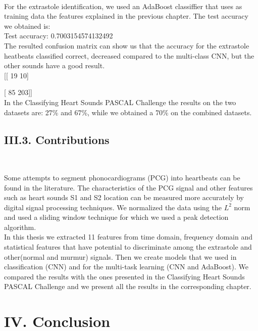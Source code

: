 \documentclass[11pt, a4papper]{report}
\theoremstyle{plain}
\theoremstyle{definition}
\theoremstyle{definition}
\theoremstyle{proposition}
\begin{document}
\

For the extrastole identification, we used an AdaBoost classiffier that uses as training data the features explained in the previous chapter. The test accuracy we obtained is:
\\

Test accuracy: 0.7003154574132492
\\

The resulted confusion matrix can show us that the accuracy for the extrastole heatbeats classified correct, decreased compared to the multi-class CNN, but the other sounds have a good result.
\\

[[ 19  10]
\

 [ 85 203]]
\\

In the Classifying Heart Sounds PASCAL Challenge the results on the two datasets are: 27\% and 67\%, while we obtained a 70\% on the combined datasets.
\newpage

\section*{III.3. Contributions}

\

Some attempts to segment phonocardiograms (PCG) into heartbeats can be found in the literature. The characteristics of the PCG signal and other features such as heart sounds S1 and S2 location can be measured more accurately by digital signal processing techniques. We normalized the data using the $L^2$ norm and used a sliding window technique for which we used a peak detection algorithm. 
\\

In this thesis we extracted 11 features from time domain, frequency domain and statistical features that have potential to discriminate among the extrastole and other(normal and murmur) signals. Then we create models that we used in classification (CNN) and for the multi-task learning (CNN and AdaBoost). We compared the results with the ones presented in the Classifying Heart Sounds PASCAL Challenge and we present all the results in the corresponding chapter.

\newpage

\chapter*{IV. Conclusion}
\end{document}
